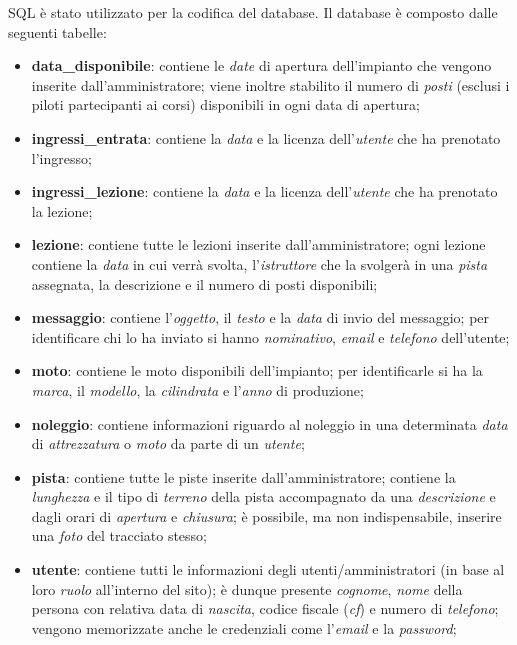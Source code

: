 SQL è stato utilizzato per la codifica del database. Il database è composto dalle seguenti tabelle:
\begin{itemize}
    \item \textbf{data\_disponibile}: contiene le \textit{date} di apertura dell'impianto che vengono
    inserite dall'amministratore; viene inoltre stabilito il numero di \textit{posti} (esclusi i piloti
    partecipanti ai corsi) disponibili in ogni data di apertura;
    \item \textbf{ingressi\_entrata}: contiene la \textit{data} e la licenza dell'\textit{utente} che ha prenotato l'ingresso;
    \item \textbf{ingressi\_lezione}: contiene la \textit{data} e la licenza dell'\textit{utente} che ha prenotato la lezione;
    \item \textbf{lezione}: contiene tutte le lezioni inserite dall'amministratore; ogni lezione contiene la \textit{data}
    in cui verrà svolta, l'\textit{istruttore} che la svolgerà in una \textit{pista} assegnata, la descrizione e il numero di posti disponibili;
    \item \textbf{messaggio}: contiene l'\textit{oggetto}, il \textit{testo} e la \textit{data} di invio del messaggio; per identificare
    chi lo ha inviato si hanno \textit{nominativo}, \textit{email} e \textit{telefono} dell'utente;
    \item \textbf{moto}: contiene le moto disponibili dell'impianto; per identificarle si ha la \textit{marca}, il \textit{modello},
    la \textit{cilindrata} e l'\textit{anno} di produzione;
    \item \textbf{noleggio}: contiene informazioni riguardo al noleggio in una determinata \textit{data} di \textit{attrezzatura} o
    \textit{moto} da parte di un \textit{utente};
    \item \textbf{pista}: contiene tutte le piste inserite dall'amministratore; contiene la \textit{lunghezza} e il tipo di \textit{terreno}
    della pista accompagnato da una \textit{descrizione} e dagli orari di \textit{apertura} e \textit{chiusura}; è possibile,
    ma non indispensabile, inserire una \textit{foto} del tracciato stesso;
    \item \textbf{utente}: contiene tutti le informazioni degli utenti/amministratori (in base al loro \textit{ruolo} all'interno del sito);
    è dunque presente \textit{cognome}, \textit{nome} della persona con relativa data di \textit{nascita}, codice fiscale (\textit{cf}) e
    numero di \textit{telefono}; vengono memorizzate anche le credenziali come l'\textit{email} e la \textit{password};
\end{itemize}